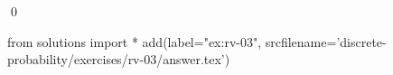 
\begin{ex} 
  \label{ex:rv-03}
  
  \qed
\end{ex} 
\begin{python0}
from solutions import *
add(label="ex:rv-03",
    srcfilename='discrete-probability/exercises/rv-03/answer.tex') 
\end{python0}
